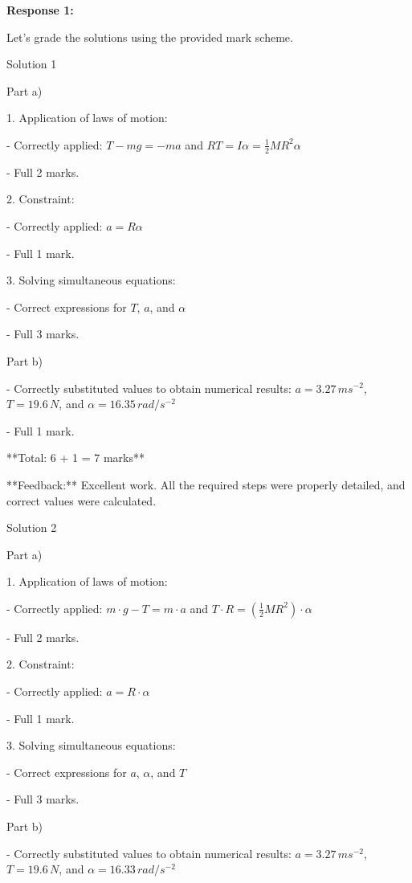 \documentclass[a4paper,11pt]{article}
\begin{document}
\textbf{Response 1:}

Let's grade the solutions using the provided mark scheme.

Solution 1

Part a)

1. Application of laws of motion:

    - Correctly applied: \( T - mg = -ma \) and \( RT = I \alpha = \frac{1}{2} M R^2 \alpha \)
    
    - Full 2 marks.

2. Constraint:

    - Correctly applied: \( a = R \alpha \)
    
    - Full 1 mark.

3. Solving simultaneous equations:

    - Correct expressions for \( T \), \( a \), and \( \alpha \)
    
    - Full 3 marks.

Part b)

- Correctly substituted values to obtain numerical results: \( a = 3.27 \, ms^{-2} \), \( T = 19.6 \, N \), and \( \alpha = 16.35 \, rad/s^{-2} \)

- Full 1 mark.

**Total: 6 + 1 = 7 marks**

**Feedback:** Excellent work. All the required steps were properly detailed, and correct values were calculated.

Solution 2

Part a)

1. Application of laws of motion:

    - Correctly applied: \( m \cdot g - T = m \cdot a \) and \( T \cdot R = \left( \frac{1}{2} M R^2 \right) \cdot \alpha \)
    
    - Full 2 marks.

2. Constraint:

    - Correctly applied: \( a = R \cdot \alpha \)
    
    - Full 1 mark.

3. Solving simultaneous equations:

    - Correct expressions for \( a \), \( \alpha \), and \( T \)
    
    - Full 3 marks.

Part b)

- Correctly substituted values to obtain numerical results: \( a = 3.27 \, ms^{-2} \), \( T = 19.6 \, N \), and \( \alpha = 16.33 \, rad/s^{-2} \)
\end{document}
